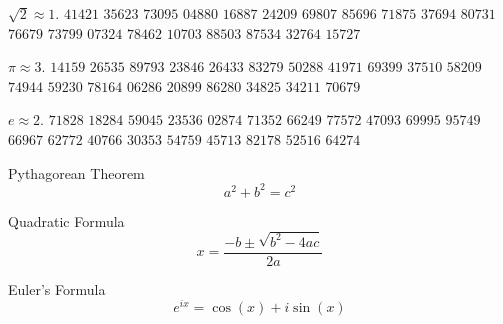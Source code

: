 \begin{multicols}{2}
\(\sqrt 2 \approx 1.\)
\(41421\)
\(35623\)
\(73095\)
\(04880\)
\(16887\)
\(24209\)
\(69807\)
\(85696\)
\(71875\)
\(37694\)
\(80731\)
\(76679\)
\(73799\)
\(07324\)
\(78462\)
\(10703\)
\(88503\)
\(87534\)
\(32764\)
\(15727\)

\(\pi \approx 3.\)
\(14159\)
\(26535\)
\(89793\)
\(23846\)
\(26433\)
\(83279\)
\(50288\)
\(41971\)
\(69399\)
\(37510\)
\(58209\)
\(74944\)
\(59230\)
\(78164\)
\(06286\)
\(20899\)
\(86280\)
\(34825\)
\(34211\)
\(70679\)

\(e \approx 2.\)
\(71828\)
\(18284\)
\(59045\)
\(23536\)
\(02874\)
\(71352\)
\(66249\)
\(77572\)
\(47093\)
\(69995\)
\(95749\)
\(66967\)
\(62772\)
\(40766\)
\(30353\)
\(54759\)
\(45713\)
\(82178\)
\(52516\)
\(64274\)

\columnbreak

Pythagorean Theorem
\[a^2+b^2=c^2\]

Quadratic Formula
\[x=\frac{-b\pm\sqrt{b^2-4ac}}{2a}\]

Euler's Formula
\[e^{ix}=\cos(x)+i\sin(x)\]
\end{multicols}

\vfill

